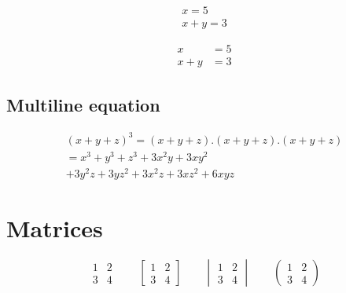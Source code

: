 \documentclass[12pt,a4paper]{article}
\begin{document}
	\begin{gather}
		x=5\\
		x+y=3
	\end{gather}
	
	\begin{align}
		x&=5\\
		x+y&=3
	\end{align}
	
	\subsection{Multiline equation}
	
	\begin{multline*}
		(x+y+z)^3=(x+y+z).(x+y+z).(x+y+z)\\
		=x^3+y^3+z^3+3x^2y+3xy^2\\
		+3y^2z+3yz^2+3x^2z+3xz^2+6xyz
	\end{multline*}
	
	\section{Matrices}
	
	\[
	\begin{matrix}
		1 & 2\\
		3 & 4
	\end{matrix}
	\qquad
	\begin{bmatrix}
		1 & 2\\
		3 & 4
	\end{bmatrix}
	\qquad
	\begin{vmatrix}
		1 & 2\\
		3 & 4
	\end{vmatrix}
	\qquad
	\begin{pmatrix}
		1 & 2\\
		3 & 4
	\end{pmatrix}
	\]
	
\end{document}

